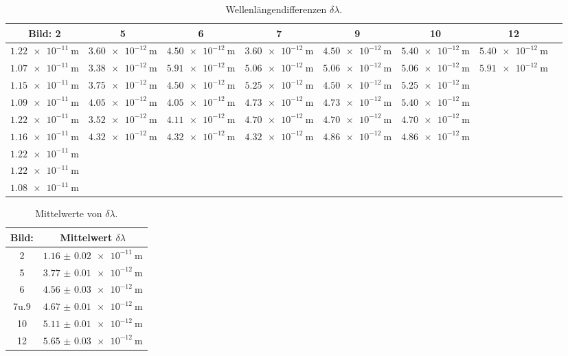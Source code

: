 \documentclass[
  bibliography=totoc,     %
  captions=tableheading,  %
  titlepage=firstiscover, %
]{scrartcl}
\begin{document}
\begin{landscape}
\begin{table}[H]
  \centering
  \caption{Wellenlängendifferenzen $\delta \lambda$.}
  \label{tab:wellenl}
  \begin{tabular}{c c c c c c c c}
    \toprule
    Bild: 2 & 5 & 6 & 7 & 9 & 10 & 12 \\
    \midrule
    $\SI{1.22e-11}{\meter}$ & $\SI{3.60e-12}{\meter}$ & $\SI{4.50e-12}{\meter}$ & $\SI{3.60e-12}{\meter}$ & $\SI{4.50e-12}{\meter}$ & $\SI{5.40e-12}{\meter}$ & $\SI{5.40e-12}{\meter}$ \\
    $\SI{1.07e-11}{\meter}$ & $\SI{3.38e-12}{\meter}$ & $\SI{5.91e-12}{\meter}$ & $\SI{5.06e-12}{\meter}$ & $\SI{5.06e-12}{\meter}$ & $\SI{5.06e-12}{\meter}$ & $\SI{5.91e-12}{\meter}$ \\
    $\SI{1.15e-11}{\meter}$ & $\SI{3.75e-12}{\meter}$ & $\SI{4.50e-12}{\meter}$ & $\SI{5.25e-12}{\meter}$ & $\SI{4.50e-12}{\meter}$ & $\SI{5.25e-12}{\meter}$ &  \\
    $\SI{1.09e-11}{\meter}$ & $\SI{4.05e-12}{\meter}$ & $\SI{4.05e-12}{\meter}$ & $\SI{4.73e-12}{\meter}$ & $\SI{4.73e-12}{\meter}$ & $\SI{5.40e-12}{\meter}$ &  \\
    $\SI{1.22e-11}{\meter}$ & $\SI{3.52e-12}{\meter}$ & $\SI{4.11e-12}{\meter}$ & $\SI{4.70e-12}{\meter}$ & $\SI{4.70e-12}{\meter}$ & $\SI{4.70e-12}{\meter}$ &  \\
    $\SI{1.16e-11}{\meter}$ & $\SI{4.32e-12}{\meter}$ & $\SI{4.32e-12}{\meter}$ & $\SI{4.32e-12}{\meter}$ & $\SI{4.86e-12}{\meter}$ & $\SI{4.86e-12}{\meter}$ &  \\
    $\SI{1.22e-11}{\meter}$ &  &  &  &  &  &  \\
    $\SI{1.22e-11}{\meter}$ &  &  &  &  &  &  \\
    $\SI{1.08e-11}{\meter}$ &  &  &  &  &  &  \\
    \bottomrule
  \end{tabular}
\end{table}
\begin{table}[H]
  \centering
  \caption{Mittelwerte von $\delta \lambda$.}
  \label{tab:wellenl2}
  \begin{tabular}{c c}
    \toprule
    Bild: & Mittelwert $\delta\lambda$ \\
    \midrule
    2 & $\SI{1.16(2)e-11}{\meter}$ \\
    5 & $\SI{3.77(1)e-12}{\meter}$ \\
    6 & $\SI{4.56(3)e-12}{\meter}$ \\
    7u.9 & $\SI{4.67(1)e-12}{\meter}$ \\
    10 & $\SI{5.11(1)e-12}{\meter}$ \\
    12 & $\SI{5.65(3)e-12}{\meter}$ \\
    \bottomrule
  \end{tabular}
\end{table}
\end{landscape}
\end{document}

